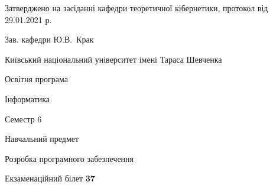 \documentclass[10pt, ukrainian]{article}
\begin{document}
{\vspace{5mm}\smallskip \begin {small} Затверджено на засіданні кафедри теоретичної кібернетики, протокол  від   29.01.2021 р.\par\smallskip\smallskip
{\parbox {6.5 cm}{Зав. кафедри \dotfill Ю.В.~Крак}} \end{small}}
\newpage

{{\begin {small}\par
{ \center  Київський національний університет імені Тараса Шевченка \par}
{\parbox {5 cm}{Освітня програма \hfill}{\parbox {7 cm}{Інформатика \hfill}}\parbox {6 cm}{\hfill Семестр 6}}\par
{\parbox {5 cm} {Навчальний предмет \hfill}\parbox {7 cm}{Розробка програмного забезпечення \hfill}\parbox {6cm}{\hfill}\par}\vspace{-7pt} \end{small}}{\center Екзаменаційний білет \No \textbf
{ 37 }\par}}
\end{document}
